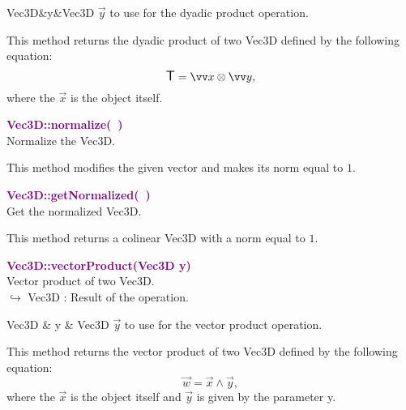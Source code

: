 \begin{tcolorbox}[width=\textwidth,myArgs,tabularx={ll|R}]
Vec3D&y&Vec3D $\overrightarrow{y}$ to use for the dyadic product operation.
\end{tcolorbox}

This method returns the dyadic product of two Vec3D defined by the following equation:
\begin{equation*}
\T = \overrightarrow{x}\otimes\overrightarrow{y},
\end{equation*}
where the $\overrightarrow{x}$ is the object itself.

\textcolor{purple}{\textbf{Vec3D::normalize(~)}}\label{Vec3D::normalize()}\\
Normalize the Vec3D.

This method modifies the given vector and makes its norm equal to $1$.

\textcolor{purple}{\textbf{Vec3D::getNormalized(~)}}\label{Vec3D::getNormalized()}\\
Get the normalized Vec3D.

This method returns a colinear Vec3D with a norm equal to $1$.

\textcolor{purple}{\textbf{Vec3D::vectorProduct(Vec3D y)}}\label{Vec3D::vectorProduct(Vec3D y)}\\
Vector product of two Vec3D.\\ \hspace*{10mm}$\hookrightarrow$ Vec3D : Result of the operation.

\begin{tcolorbox}[width=\textwidth,myArgs,tabularx={ll|R}]
Vec3D & y & Vec3D $\overrightarrow{y}$ to use for the vector product operation.
\end{tcolorbox}

This method returns the vector product of two Vec3D defined by the following equation:
\begin{equation*}
\overrightarrow{w} = \overrightarrow{x}\land\overrightarrow{y},
\end{equation*}
where the $\overrightarrow{x}$ is the object itself and $\overrightarrow{y}$ is given by the parameter y.

